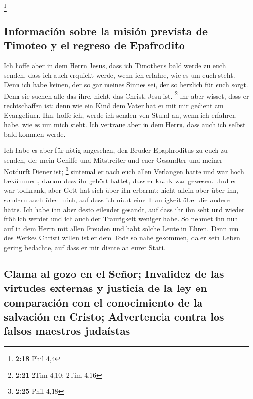 \footnote{\textbf{2:18} Phil 4,4}

\hypertarget{informaciuxf3n-sobre-la-misiuxf3n-prevista-de-timoteo-y-el-regreso-de-epafrodito}{%
\subsection{Información sobre la misión prevista de Timoteo y el regreso
de
Epafrodito}\label{informaciuxf3n-sobre-la-misiuxf3n-prevista-de-timoteo-y-el-regreso-de-epafrodito}}

 Ich hoffe aber in dem Herrn Jesus, dass ich Timotheus
bald werde zu euch senden, dass ich auch erquickt werde, wenn ich
erfahre, wie es um euch steht.  Denn ich habe keinen, der
so gar meines Sinnes sei, der so herzlich für euch sorgt.
 Denn sie suchen alle das ihre, nicht, das Christi Jesu
ist. \footnote{\textbf{2:21} 2Tim 4,10; 2Tim 4,16}  Ihr
aber wisset, dass er rechtschaffen ist; denn wie ein Kind dem Vater hat
er mit mir gedient am Evangelium.  Ihn, hoffe ich, werde
ich senden von Stund an, wenn ich erfahren habe, wie es um mich steht.
 Ich vertraue aber in dem Herrn, dass auch ich selbst
bald kommen werde.

 Ich habe es aber für nötig angesehen, den Bruder
Epaphroditus zu euch zu senden, der mein Gehilfe und Mitstreiter und
euer Gesandter und meiner Notdurft Diener ist; \footnote{\textbf{2:25}
  Phil 4,18}  sintemal er nach euch allen Verlangen hatte
und war hoch bekümmert, darum dass ihr gehört hattet, dass er krank war
gewesen.  Und er war todkrank, aber Gott hat sich über
ihn erbarmt; nicht allein aber über ihn, sondern auch über mich, auf
dass ich nicht eine Traurigkeit über die andere hätte. 
Ich habe ihn aber desto eilender gesandt, auf dass ihr ihn seht und
wieder fröhlich werdet und ich auch der Traurigkeit weniger habe.
 So nehmet ihn nun auf in dem Herrn mit allen Freuden und
habt solche Leute in Ehren.  Denn um des Werkes Christi
willen ist er dem Tode so nahe gekommen, da er sein Leben gering
bedachte, auf dass er mir diente an eurer Statt.

\hypertarget{clama-al-gozo-en-el-seuxf1or-invalidez-de-las-virtudes-externas-y-justicia-de-la-ley-en-comparaciuxf3n-con-el-conocimiento-de-la-salvaciuxf3n-en-cristo-advertencia-contra-los-falsos-maestros-judauxedstas}{%
\subsection{Clama al gozo en el Señor; Invalidez de las virtudes
externas y justicia de la ley en comparación con el conocimiento de la
salvación en Cristo; Advertencia contra los falsos maestros
judaístas}\label{clama-al-gozo-en-el-seuxf1or-invalidez-de-las-virtudes-externas-y-justicia-de-la-ley-en-comparaciuxf3n-con-el-conocimiento-de-la-salvaciuxf3n-en-cristo-advertencia-contra-los-falsos-maestros-judauxedstas}}

